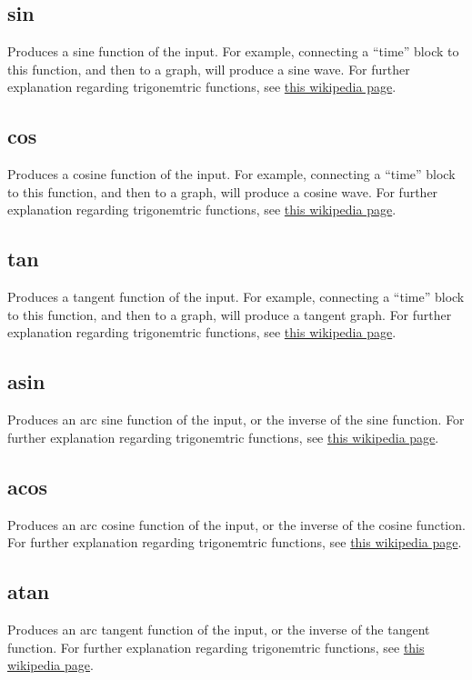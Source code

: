 \subsection{sin}\label{Operation:sin} Produces a sine function of the input. For example, 
connecting a ``time'' block to this function, and then to a graph, will produce a sine wave.
For further explanation regarding trigonemtric functions, 
see \href{https://en.wikipedia.org/wiki/Trigonometric_functions}{this wikipedia page}.

\subsection{cos}\label{Operation:cos} Produces a cosine function of the input. For example, 
connecting a ``time'' block to this function, and then to a graph, will produce a cosine wave.
For further explanation regarding trigonemtric functions, 
see \href{https://en.wikipedia.org/wiki/Trigonometric_functions}{this wikipedia page}.

\subsection{tan}\label{Operation:tan} Produces a tangent function of the input. For example, 
connecting a ``time'' block to this function, and then to a graph, will produce a tangent graph.
For further explanation regarding trigonemtric functions, 
see \href{https://en.wikipedia.org/wiki/Trigonometric_functions}{this wikipedia page}.

\subsection{asin}\label{Operation:asin} Produces an arc sine function of the input, 
or the inverse of the sine function. For further explanation regarding trigonemtric functions, 
see \href{https://en.wikipedia.org/wiki/Trigonometric_functions}{this wikipedia page}.

\subsection{acos}\label{Operation:acos} Produces an arc cosine function of the input, 
or the inverse of the cosine function. For further explanation regarding trigonemtric functions, 
see \href{https://en.wikipedia.org/wiki/Trigonometric_functions}{this wikipedia page}.

\subsection{atan}\label{Operation:atan} Produces an arc tangent function of the input, 
or the inverse of the tangent function. For further explanation regarding trigonemtric functions, 
see \href{https://en.wikipedia.org/wiki/Trigonometric_functions}{this wikipedia page}.

